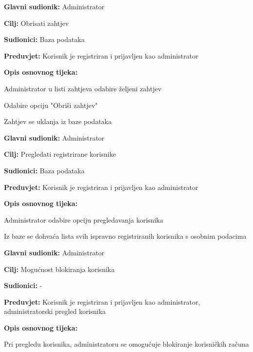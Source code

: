 \noindent {}
\begin{packed_item}
	\item \textbf{Glavni sudionik: }Administrator
	\item  \textbf{Cilj:} Obrisati zahtjev
	\item  \textbf{Sudionici:} Baza podataka
	\item  \textbf{Preduvjet:} Korisnik je registriran i prijavljen kao administrator
	\item  \textbf{Opis osnovnog tijeka:}
	\item[] \begin{packed_enum}
		\item Administrator u listi zahtjeva odabire željeni zahtjev
		\item Odabire opciju "Obriši zahtjev"
		\item Zahtjev se uklanja iz baze podataka
	\end{packed_enum}
\end{packed_item}
\newpage
\noindent {}
\begin{packed_item}
	
	\item \textbf{Glavni sudionik: }Administrator
	\item  \textbf{Cilj:} Pregledati registrirane korisnike
	\item  \textbf{Sudionici:} Baza podataka
	\item  \textbf{Preduvjet:} Korisnik je registriran i prijavljen kao administrator
	\item  \textbf{Opis osnovnog tijeka:}
	
	\item[] \begin{packed_enum}
		
		\item Administrator odabire opciju pregledavanja korisnika
		\item Iz baze se dohvaća lista svih ispravno registriranih korisnika s osobnim podacima
	\end{packed_enum}
\end{packed_item}

\noindent {}
\begin{packed_item}
	\item \textbf{Glavni sudionik: }Administrator
	\item  \textbf{Cilj:} Mogućnost blokiranja korisnika
	\item  \textbf{Sudionici:} -
	\item  \textbf{Preduvjet:} Korisnik je registriran i prijavljen kao administrator, administratorski pregled korisnika
	\item  \textbf{Opis osnovnog tijeka:}
	
	\item[] \begin{packed_enum}
		
		\item Pri pregledu korisnika, administratoru se omogućuje blokiranje korisničkih računa
	\end{packed_enum}
\end{packed_item}


